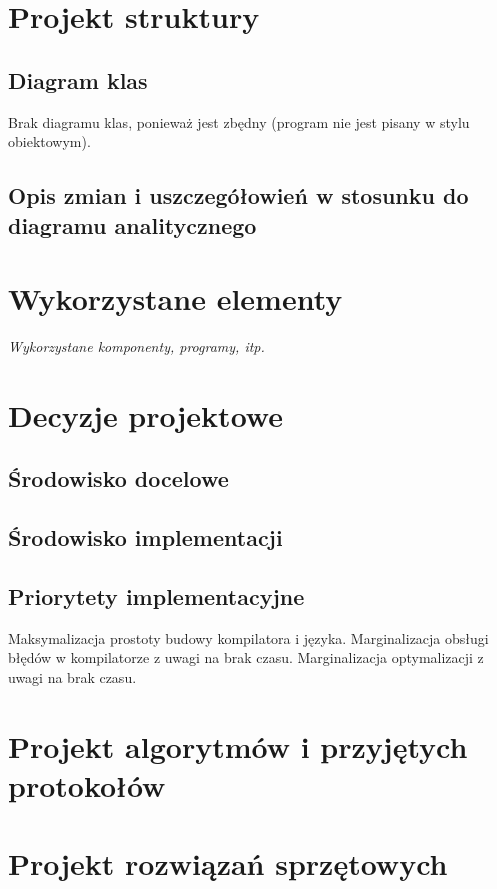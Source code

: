 \documentclass[11pt,oneside,a4paper,titlepage,onecolumn]{article}
\begin{document}
\section{Projekt struktury}

\subsection{Diagram klas}

Brak diagramu klas, ponieważ jest zbędny (program nie jest pisany w stylu obiektowym).

\subsection{Opis zmian i uszczegółowień w stosunku do diagramu analitycznego}

\section{Wykorzystane elementy}

\emph{Wykorzystane komponenty, programy, itp.}

\section{Decyzje projektowe}

\subsection{Środowisko docelowe}

\subsection{Środowisko implementacji}

\subsection{Priorytety implementacyjne}

Maksymalizacja prostoty budowy kompilatora i języka.
Marginalizacja obsługi błędów w kompilatorze z uwagi na brak czasu.
Marginalizacja optymalizacji z uwagi na brak czasu.

\section{Projekt algorytmów i przyjętych protokołów}

\section{Projekt rozwiązań sprzętowych}
\end{document}
